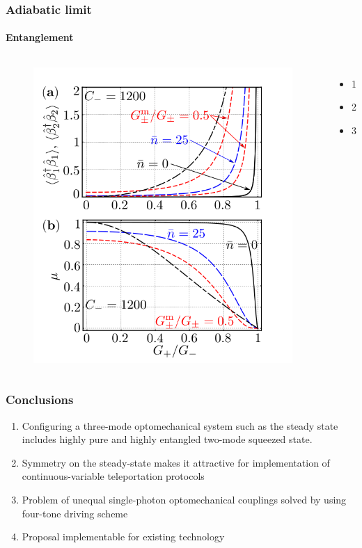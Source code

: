 \documentclass[aspectratio=43]{beamer}
\begin{document}
\begin{frame}
	
	\frametitle{Adiabatic limit}
	\framesubtitle{Entanglement}
	
	\begin{columns}
		
		
		\begin{figure}
			\includegraphics[width = 6 cm]{plots/plot_steady_state.png}
		\end{figure}	
		
		
		\begin{itemize}
			\item 1
			\item 2
			\item 3
		\end{itemize}
		
	\end{columns}

\end{frame}

\begin{frame}

	\frametitle{Conclusions}
	
	\begin{enumerate}
		\item Configuring a three-mode optomechanical system such as the steady state includes highly pure and highly entangled two-mode squeezed state.
		\item Symmetry on the steady-state makes it attractive for implementation of  continuous-variable teleportation protocols
		\item Problem of unequal single-photon optomechanical couplings solved by using four-tone driving scheme
		\item Proposal implementable for existing technology
	\end{enumerate}
		
\end{frame}
\end{document}
